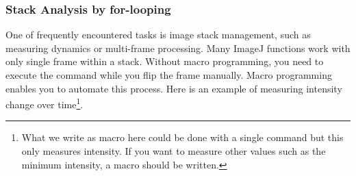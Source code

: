 \subsubsection{Stack Analysis by for-looping}
\label{sec:forloopStack} 
One of frequently encountered tasks is image stack management, 
such as measuring dynamics or multi-frame processing. 
Many ImageJ functions work with only single frame within a stack. 
Without macro programming, you need to execute the command while you flip the frame manually. 
Macro programming enables you to automate this process. 
Here is an example of measuring intensity change over time\footnote{What we write as macro here could be done with a single command  but this only measures intensity. If you want to measure other values such as the minimum intensity, a macro should be written. }.

\label{code:10}